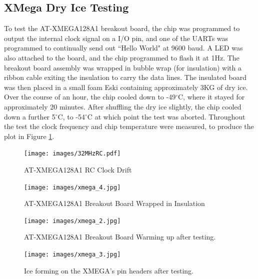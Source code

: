 \documentclass[a4paper,12pt]{article}
\begin{document}
\newpage
\begin{appendices}
\section{XMega Dry Ice Testing}
\label{xmegadryice}
To test the AT-XMEGA128A1 breakout board, the chip was programmed to output the internal clock signal on a I/O pin, and one of the UARTs was programmed to continually send out ``Hello World" at 9600 baud. A LED was also attached to the board, and the chip programmed to flash it at 1Hz. The breakout board assembly was wrapped in bubble wrap (for insulation) with a ribbon cable exiting the insulation to carry the data lines. The insulated board was then placed in a small foam Eski containing approximately 3KG of dry ice. Over the course of an hour, the chip cooled down to -49$^\circ$C, where it stayed for approximately 20 minutes. After shuffling the dry ice slightly, the chip cooled down a further 5$^\circ$C, to -54$^\circ$C at which point the test was aborted. Throughout the test the clock frequency and chip temperature were measured, to produce the plot in Figure \ref{32mhzrc}.


\begin{figure}[h!]
\begin{center}
\texttt{[image: images/32MHzRC.pdf]}
\caption{AT-XMEGA128A1 RC Clock Drift}
\label{32mhzrc}
\end{center}
\end{figure}

\begin{figure}[h!]
\begin{center}
\texttt{[image: images/xmega\_4.jpg]}
\caption{AT-XMEGA128A1 Breakout Board Wrapped in Insulation}
\label{xmega_4}
\end{center}
\end{figure}

\newpage
\begin{figure}[h!]
\begin{center}
\texttt{[image: images/xmega\_2.jpg]}
\caption{AT-XMEGA128A1 Breakout Board Warming up after testing.}
\label{xmega_2}
\end{center}
\end{figure}

\begin{figure}[h!]
\begin{center}
\texttt{[image: images/xmega\_3.jpg]}
\caption{Ice forming on the XMEGA's pin headers after testing.}
\label{xmega_3}
\end{center}
\end{figure}


\end{appendices}
\end{document}
